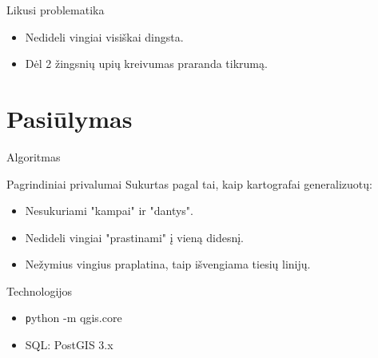 \documentclass[14pt]{beamer}
\begin{document}
\begin{frame}{Likusi problematika}
    \pause
    \begin{itemize}[<+->]
        \item Nedideli vingiai visiškai dingsta.
        \item Dėl 2 žingsnių upių kreivumas praranda tikrumą.
    \end{itemize}
\end{frame}

\section{Pasiūlymas}

\begin{frame}{Algoritmas}
    \begin{center}
    \end{center}
\end{frame}

\begin{frame}{Pagrindiniai privalumai}
    Sukurtas pagal tai, kaip kartografai generalizuotų:
    \pause
    \begin{itemize}[<+->]
        \item Nesukuriami "kampai" ir "dantys".
        \item Nedideli vingiai "prastinami" į vieną didesnį.
        \item Nežymius vingius praplatina, taip išvengiama tiesių linijų.
    \end{itemize}
\end{frame}

\begin{frame}{Technologijos}
    \begin{itemize}[<+->]
        \item {\texttt python -m qgis.core}
        \item SQL: PostGIS 3.x
    \end{itemize}
\end{frame}
\end{document}
